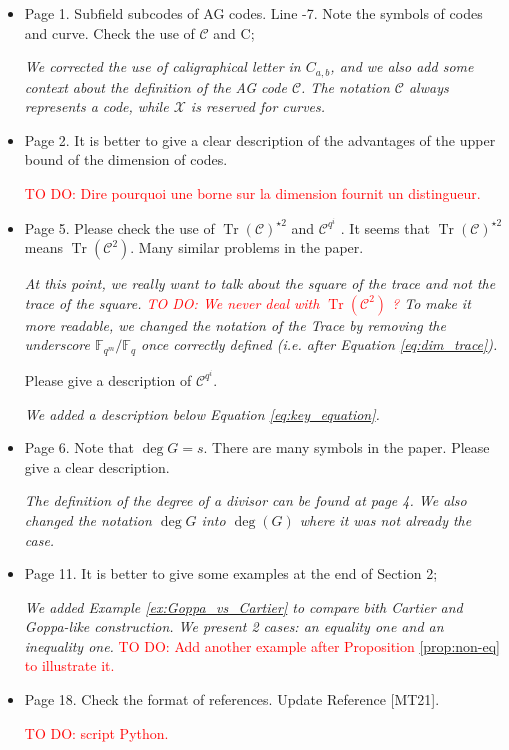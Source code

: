 \documentclass[12pt,a4paper]{amsart}
\newcommand\TODO[1]{\textcolor{red}{TO DO: #1}}
\DeclareMathOperator{\trace}{Tr}
\newcommand{\calC}{\mathcal{C}}
\newcommand{\calX}{\mathcal{X}}
\newcommand{\Tr}[1]{\trace\!\left(#1\right)}
\begin{document}
\begin{itemize}
 
\item  Page 1. Subfield subcodes of AG codes. Line -7. Note the symbols of codes and curve. Check the use of $\calC$ and C; 

\textit{We corrected the use of caligraphical letter in $C_{a,b}$, and we also add some context about the definition of the AG code $\calC$. The notation $\calC$ always represents a code, while $\calX$ is reserved for curves.}
 
\item Page 2. It is better to give a clear description of the advantages of the upper bound of the dimension of codes.

\TODO{Dire pourquoi une borne sur la dimension fournit un distingueur.}  


\item  Page 5. Please check the use of $\Tr{\calC}^{\star 2}$ and $\calC^{q^i}$
. It seems that $\Tr{\calC}^{\star 2}$ means $\Tr{\calC^2}$. Many similar problems in the paper.

\textit{At this point, we really want to talk about the square of the trace and not the trace of the square. \TODO{We never deal with $\Tr{\calC^2}$ ?} To make it more readable, we changed the notation of the Trace by removing the underscore $\mathbb{F}_{q^m}/\mathbb{F}_q$ once correctly defined (i.e. after Equation \eqref{eq:dim_trace}).}

\noindent Please give a description of $\calC^{q^i}$.
 
\textit{We added a description below Equation \eqref{eq:key_equation}.}

\item Page 6. Note that $\deg G = s$. There are many symbols in the paper. Please give a clear description.

\textit{The definition of the degree of a divisor can be found at page 4. We also changed the notation $\deg G$ into $\deg(G)$ where it was not already the case.}


\item Page 11. It is better to give some examples at the end of Section 2;

\textit{We added Example \ref{ex:Goppa_vs_Cartier} to compare bith Cartier and Goppa-like construction. We present 2 cases: an equality one and an inequality one.}
\TODO{Add another example after Proposition \ref{prop:non-eq} to illustrate it.}


\item Page 18. Check the format of references. Update Reference [MT21].

\TODO{script Python.} 

\end{itemize} 
\end{document}
